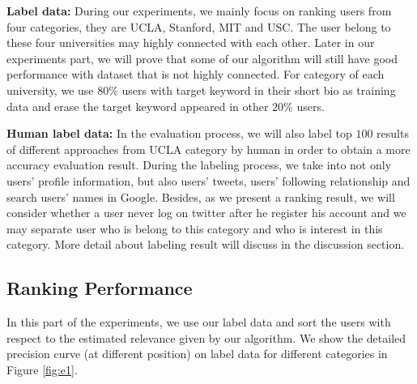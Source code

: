 \documentclass{article}
\begin{document}
\textbf{Label data:} During our experiments, we mainly focus on ranking users from four categories, they are UCLA, Stanford, MIT and USC. The user belong to these four universities may highly connected with each other. Later in our experiments part, we will prove that some of our algorithm will still have good performance with dataset that is not highly connected. For category of each university, we use $80\%$ users with target keyword in their short bio as training data and erase the target keyword appeared in other $20\%$ users.

\textbf{Human label data:} In the evaluation process, we will also label top $100$ results of different approaches from UCLA category by human in order to obtain a more accuracy evaluation result. During the labeling process, we take into not only users' profile information, but also users' tweets, users' following relationship and search users' names in Google. Besides, as we present a ranking result, we will consider whether a user never log on twitter after he register his account and we may separate user who is belong to this category and who is interest in this category. More detail about labeling result will discuss in the discussion section.

\subsection{Ranking Performance}
In this part of the experiments, we use our label data and sort the users with respect to the estimated relevance given by our algorithm. We show the detailed precision curve (at different position) on label data for different categories in Figure \ref{fig:e1}.
\end{document}
